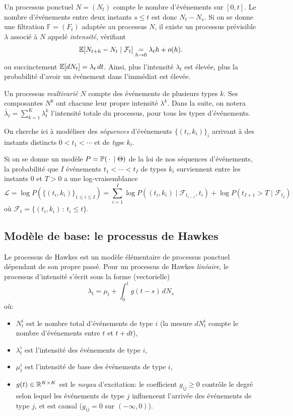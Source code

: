 \documentclass[../main.tex]{subfiles}
\begin{document}
Un processus ponctuel $N = (N_t)$ compte le nombre d'événements sur $[0,t]$. Le nombre d'événements entre deux instants $s\leq t$ est donc $N_t - N_s$. Si on se donne une filtration $\mathds{F} = (F_t)$ adaptée au processus $N$, il existe un processus prévisible $\lambda$ associé à $N$ appelé \textit{intensité}, vérifiant
\[
	\mathbb{E} [N_{t+h} - N_t \mid \mathcal{F}_t] \underset{h\to 0}{=} \lambda_th + o(h).
\]
ou succinctement $\mathbb{E}[dN_t] = \lambda_t\,dt$.
Ainsi, plus l'intensité $\lambda_t$ est élevée, plus la probabilité d'avoir un événement dans l'immédiat est élevée.

Un processus \textit{multivarié} $N$ compte des événements de plusieurs types $k$. Ses composantes $N^k$ ont chacune leur propre intensité $\lambda^k$. Dans la suite, on notera $\bar{\lambda}_t = \sum_{k=1}^{K}\lambda^k_t$ l'intensité totale du processus, pour tous les types d'événements.

On cherche ici à modéliser des \textit{séquences} d'événements ${\{(t_i,k_i)\}}_i$ arrivant à des instants distincts $0<t_1 < \cdots$ et de \textit{type} $k_i$.

Si on se donne un modèle $P = \mathbb{P}(\,\cdot\,\mid \Theta)$ de la loi de nos séquences d'événements, la probabilité que $I$ événements $t_1<\cdots<t_I$ de types $k_i$ surviennent entre les instants $0$ et $T > 0$ a une log-vraisemblance
\begin{equation}\label{eq:likelihood}
	\mathcal{L} =
	\log P(\{(t_i,k_i)\}_{1\leq i\leq I}) =
	\sum_{i=1}^{I} \log P((t_i,k_i)\mid \mathcal{F}_{t_{i-1}}, t_i)
	+ \log P(t_{I+1}>T\mid \mathcal{F}_{t_{I}})
\end{equation}
où $\mathcal{F}_t = \{ (t_i,k_i)\,:\, t_i \leq t \}$.



\subsection{Modèle de base: le processus de Hawkes}

Le processus de Hawkes est un modèle élémentaire de processus ponctuel dépendant de son propre passé. Pour un processus de Hawkes \textit{linéaire}, le processus d'intensité s'écrit sous la forme (vectorielle)
\begin{equation}
\lambda_t = \mu_t + \int_0^t g(t-s)\,dN_s
\end{equation}
où:\begin{itemize}
	\item $N^i_t$ est le nombre total d'événements de type $i$ (la mesure $dN^i_t$ compte le nombre d'événements entre $t$ et $t+dt$),
	\item $\lambda_t^i$ est l'intensité des événements de type $i$,
	\item $\mu^i_t$ est l'intensité de base des événements de type $i$,
	\item $g(t) \in \mathbb{R}^{K\times K}$ est le \textit{noyau} d'excitation: le coefficient $g_{ij} \geq 0$ contrôle le degré selon lequel les événements de type $j$ influencent l'arrivée des événements de type $j$, et est causal ($g_{ij} = 0$ sur $(-\infty, 0)$).
\end{itemize}
\end{document}
